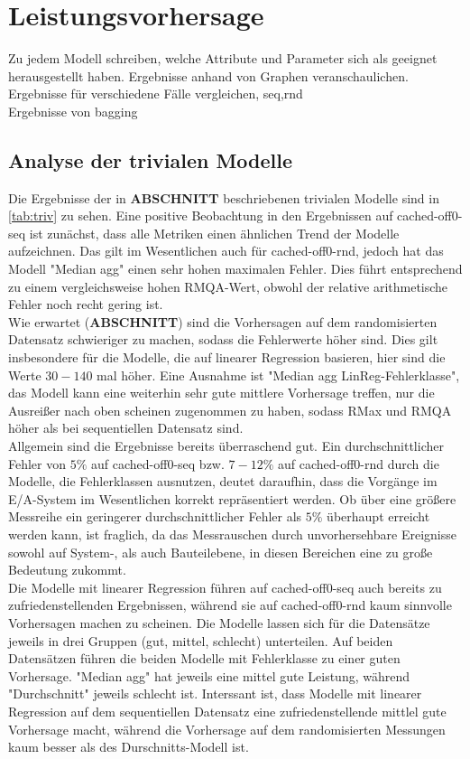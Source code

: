 \documentclass[
	12pt,
	a4paper,
	BCOR10mm,
	DIV14,
	listof=totoc,
	bibliography=totoc,
	headsepline
]{scrreprt}
\begin{document}
\section{Leistungsvorhersage}
Zu jedem Modell schreiben, welche Attribute und Parameter sich als geeignet herausgestellt haben. Ergebnisse anhand von Graphen veranschaulichen.\\
Ergebnisse für verschiedene Fälle vergleichen, seq,rnd\\
Ergebnisse von bagging

\subsection{Analyse der trivialen Modelle}

Die Ergebnisse der in \textbf{ABSCHNITT} beschriebenen trivialen Modelle sind in \ref{tab:triv} zu sehen. Eine positive Beobachtung in den Ergebnissen auf cached-off0-seq ist zunächst, dass alle Metriken einen ähnlichen Trend der  Modelle aufzeichnen. Das gilt im Wesentlichen auch für cached-off0-rnd, jedoch hat das Modell "Median agg" einen sehr hohen maximalen Fehler. Dies führt entsprechend zu einem vergleichsweise hohen RMQA-Wert, obwohl der relative arithmetische Fehler noch recht gering ist. \\
Wie erwartet (\textbf{ABSCHNITT}) sind die Vorhersagen auf dem randomisierten Datensatz schwieriger zu machen, sodass die Fehlerwerte höher sind. Dies gilt insbesondere für die Modelle, die auf linearer Regression basieren, hier sind die Werte $30-140$ mal höher. Eine Ausnahme ist "Median agg LinReg-Fehlerklasse", das Modell kann eine weiterhin sehr gute mittlere Vorhersage treffen, nur die Ausreißer nach oben scheinen zugenommen zu haben, sodass RMax und RMQA höher als bei sequentiellen Datensatz sind.\\
Allgemein sind die Ergebnisse bereits überraschend gut. Ein durchschnittlicher Fehler von $5\%$ auf cached-off0-seq bzw. $7-12\%$ auf cached-off0-rnd durch die Modelle, die Fehlerklassen ausnutzen, deutet daraufhin, dass die Vorgänge im E/A-System im Wesentlichen korrekt repräsentiert werden. Ob über eine größere Messreihe ein geringerer durchschnittlicher Fehler als $5\%$ überhaupt erreicht werden kann, ist fraglich, da das Messrauschen durch unvorhersehbare Ereignisse sowohl auf System-, als auch Bauteilebene, in diesen Bereichen eine zu große Bedeutung zukommt.\\
Die Modelle mit linearer Regression führen auf cached-off0-seq auch bereits zu zufriedenstellenden Ergebnissen, während sie auf cached-off0-rnd kaum sinnvolle Vorhersagen machen zu scheinen. Die Modelle lassen sich für die Datensätze jeweils in drei Gruppen (gut, mittel, schlecht) unterteilen. Auf beiden Datensätzen führen die beiden Modelle mit Fehlerklasse zu einer guten Vorhersage. "Median agg" hat jeweils eine mittel gute Leistung, während "Durchschnitt" jeweils schlecht ist. Interssant ist, dass Modelle mit linearer Regression auf dem sequentiellen Datensatz eine zufriedenstellende mittlel gute Vorhersage macht, während die Vorhersage auf dem randomisierten Messungen kaum besser als des Durschnitts-Modell ist. \\ 
\end{document}
